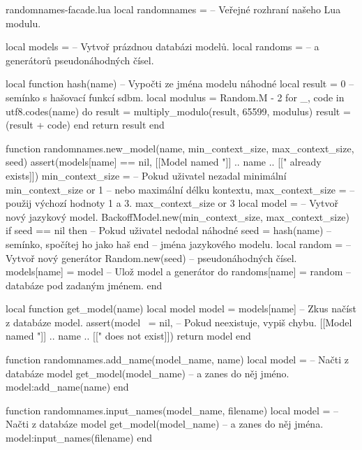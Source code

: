 \documentclass{csbulletin}
\begin{document}
\begin{filecontents}{randomnames-facade.lua}
local randomnames = {}      -- Veřejné rozhraní našeho Lua modulu.

local models = {}           -- Vytvoř prázdnou databázi modelů.
local randoms = {}          -- a generátorů pseudonáhodných čísel.

local function hash(name)   -- Vypočti ze jména modelu náhodné
  local result = 0          -- semínko s hašovací funkcí sdbm.
  local modulus = Random.M - 2
  for _, code in utf8.codes(name) do
    result = multiply_modulo(result, 65599, modulus)
    result = (result + code) %
  end
  return result
end

function randomnames.new_model(name, min_context_size,
                               max_context_size, seed)
  assert(models[name] == nil,
         [[Model named "]] .. name .. [[" already exists]])
  min_context_size =        -- Pokud uživatel nezadal minimální
    min_context_size or 1   -- nebo maximální délku kontextu,
  max_context_size =        -- použij výchozí hodnoty 1 a 3.
    max_context_size or 3
  local model =             -- Vytvoř nový jazykový model.
    BackoffModel.new(min_context_size, max_context_size)
  if seed == nil then       -- Pokud uživatel nedodal náhodné
    seed = hash(name)       -- semínko, spočítej ho jako haš
  end                       -- jména jazykového modelu.
  local random =            -- Vytvoř nový generátor
    Random.new(seed)        -- pseudonáhodných čísel.
  models[name] = model      -- Ulož model a generátor do
  randoms[name] = random    -- databáze pod zadaným jménem.
end

local function get_model(name)
  local model
  model = models[name]      -- Zkus načíst z databáze model.
  assert(model ~= nil,      -- Pokud neexistuje, vypiš chybu.
         [[Model named "]] .. name .. [[" does not exist]])
  return model
end

function randomnames.add_name(model_name, name)
  local model =             -- Načti z databáze model
    get_model(model_name)   -- a zanes do něj jméno.
  model:add_name(name)
end

function randomnames.input_names(model_name, filename)
  local model =             -- Načti z databáze model
    get_model(model_name)   -- a zanes do něj jména.
  model:input_names(filename)
end


\end{filecontents}
\end{document}
